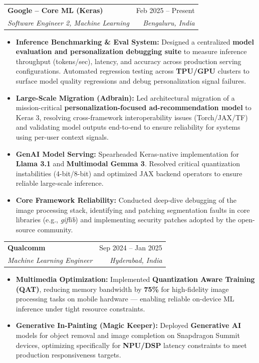 \documentclass[10pt, letterpaper]{article}
\makeatletter
\newcommand{\resumeItem}[1]{
  \item\small{
    {#1 \vspace{-2pt}}
  }
}
\newcommand{\resumeSubheading}[4]{
  \vspace{-1pt}\item
    \begin{tabular*}{0.98\textwidth}[t]{l@{\extracolsep{\fill}}r}
      \textbf{#1} & {\small\color{darkgray} #2} \\
      \textit{\small#3} & \textit{\small\color{darkgray} #4} \\
    \end{tabular*}\vspace{-7pt}
}
\newcommand{\resumeItemListStart}{\begin{itemize}}
\newcommand{\resumeItemListEnd}{\end{itemize}\vspace{-5pt}}
\makeatother
\begin{document}
    \resumeSubheading
      {Google -- Core ML (Keras)}{Feb 2025 -- Present}
      {Software Engineer 2, Machine Learning}{Bengaluru, India}
      \resumeItemListStart
        \resumeItem{\textbf{Inference Benchmarking \& Eval System:} Designed a centralized \textbf{model evaluation and personalization debugging suite} to measure inference throughput (tokens/sec), latency, and accuracy across production serving configurations. Automated regression testing across \textbf{TPU/GPU} clusters to surface model quality regressions and debug personalization signal failures.}
        \resumeItem{\textbf{Large-Scale Migration (Adbrain):} Led architectural migration of a mission-critical \textbf{personalization-focused ad-recommendation model} to Keras 3, resolving cross-framework interoperability issues (Torch/JAX/TF) and validating model outputs end-to-end to ensure reliability for systems using per-user context signals.}
        \resumeItem{\textbf{GenAI Model Serving:} Spearheaded Keras-native implementation for \textbf{Llama 3.1} and \textbf{Multimodal Gemma 3}. Resolved critical quantization instabilities (4-bit/8-bit) and optimized JAX backend operators to ensure reliable large-scale inference.}
        \resumeItem{\textbf{Core Framework Reliability:} Conducted deep-dive debugging of the image processing stack, identifying and patching segmentation faults in core libraries (e.g., \textit{giflib}) and implementing security patches adopted by the open-source community.}
      \resumeItemListEnd

    \resumeSubheading
      {Qualcomm}{Sep 2024 -- Jan 2025}
      {Machine Learning Engineer}{Hyderabad, India}
      \resumeItemListStart
        \resumeItem{\textbf{Multimedia Optimization:} Implemented \textbf{Quantization Aware Training (QAT)}, reducing memory bandwidth by \textbf{75\%} for high-fidelity image processing tasks on mobile hardware — enabling reliable on-device ML inference under tight resource constraints.}
        \resumeItem{\textbf{Generative In-Painting (Magic Keeper):} Deployed \textbf{Generative AI} models for object removal and image completion on Snapdragon Summit devices, optimizing specifically for \textbf{NPU/DSP} latency constraints to meet production responsiveness targets.}
      \resumeItemListEnd
\end{document}
